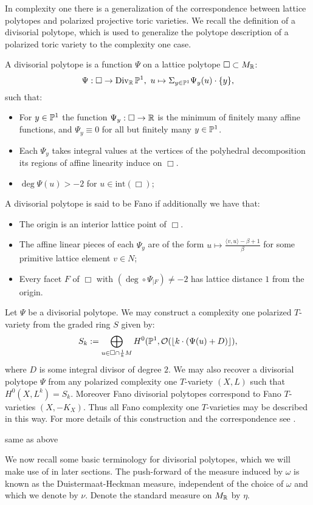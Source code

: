 In complexity one there is a generalization of the correspondence between lattice polytopes and polarized projective toric varieties. We recall the definition of a divisorial polytope, which is used to generalize the polytope description of a polarized toric variety to the complexity one case.
\begin{definition} \label{def:divpol}
A divisorial polytope is a function \(\Psi\) on a lattice polytope \(\Box \subset M_{\mathbb{R}}\):
\[
\Psi: \Box \to \operatorname{Div}_{\mathbb{R}} \mathbb{P}^1, \ u \mapsto \Sigma_{y \in \mathbb{P}^1} \Psi_y(u) \cdot \{y\},
\]
such that:
\begin{itemize}
\item For \(y \in \mathbb{P}^1\) the function \(\Psi_y: \Box \to \mathbb{R}\) is the minimum of finitely many  affine functions, and \(\Psi_y \equiv 0\) for all but finitely many \(y \in \mathbb{P}^1\).
\item Each \(\Psi_y\) takes integral values at the vertices of the polyhedral decomposition its regions of affine linearity induce on \(\Box\).
\item \(\deg \Psi(u) > -2\) for \(u \in \text{int} (\Box)\);
\end{itemize}
A divisorial polytope is said to be Fano if additionally we have that:
\begin{itemize}
\item The origin is an interior lattice point of \(\Box\).
\item The affine linear pieces of each  \(\Psi_y\) are of the form \(u \mapsto \frac{\langle v,u \rangle - \beta + 1}{\beta}\) for some primitive lattice element \(v \in N\);
\item Every facet \(F\) of \(\Box\) with \((\deg \circ \Psi _{|F}) \neq -2\) has lattice distance \(1\) from the origin.
\end{itemize}
\end{definition}
Let \(\Psi\) be a divisorial polytope. We may construct a complexity one polarized \(T\)-variety from the graded ring \(S\) given by: 
\[
S_k := \bigoplus_{u \in \Box \cap \frac{1}{k} M} H^0(\mathbb{P}^1, \mathcal{O}(\lfloor k \cdot ( \Psi(u) +D) \rfloor),
\]
where \(D\) is some integral divisor of degree \(2\). We may also recover a divisorial polytope \(\Psi\) from any polarized complexity one \(T\)-variety \((X,L)\) such that \( H^0(X,L^k) = S_k\). Moreover Fano divisorial polytopes correspond to Fano \(T\)-varieties \((X,-K_X)\). Thus all Fano complexity one \(T\)-varieties may be described in this way. For more details of this construction and the correspondence see \cite{suss2013fano}.
\begin{example}
same as above
\end{example}
We now recall some basic terminology for divisorial polytopes, which we will make use of in later sections. The push-forward of the measure induced by \(\omega\) is known as the Duistermaat-Heckman measure, independent of the choice of \(\omega\) and which we denote by \(\nu\). Denote the standard measure on \(M_{\mathbb{R}}\) by \(\eta\).

